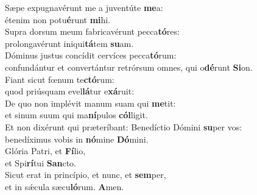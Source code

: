 \evenverse Sæpe expugnavérunt me a juventúte \textbf{me}a:~\*\\
\evenverse étenim non potu\textbf{é}runt \textbf{mi}hi.\\
\oddverse Supra dorsum meum fabricavérunt pecca\textbf{tó}res:~\*\\
\oddverse prolongavérunt iniqui\textbf{tá}tem \textbf{su}am.\\
\evenverse Dóminus justus concídit cervíces pecca\textbf{tó}rum:~\*\\
\evenverse confundántur et convertántur retrórsum omnes, qui o\textbf{dé}runt \textbf{Si}on.\\
\oddverse Fiant sicut fœnum te\textbf{ctó}rum:~\*\\
\oddverse quod priúsquam evel\textbf{lá}tur e\textbf{xá}ruit:\\
\evenverse De quo non implévit manum suam qui \textbf{me}tit:~\*\\
\evenverse et sinum suum qui ma\textbf{ní}pulos \textbf{cól}ligit.\\
\oddverse Et non dixérunt qui præteríbant: Benedíctio Dómini \textbf{su}per vos:~\*\\
\oddverse benedíximus vobis in \textbf{nó}mine \textbf{Dó}mini.\\
\evenverse Glória Patri, et \textbf{Fí}lio,~\*\\
\evenverse et Spi\textbf{rí}tui \textbf{San}cto.\\
\oddverse Sicut erat in princípio, et nunc, et \textbf{sem}per,~\*\\
\oddverse et in sǽcula sæcu\textbf{ló}rum. \textbf{A}men.\\
